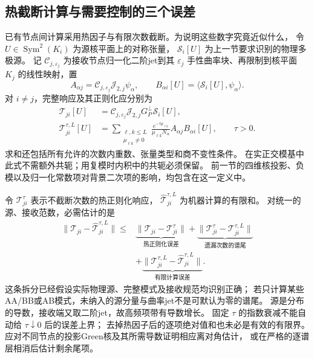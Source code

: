 \documentclass[UTF8,a4paper,11pt,fontset=fandol]{ctexart}
\numberwithin{equation}{section}
\theoremstyle{definition}
\begin{document}
\subsection{热截断计算与需要控制的三个误差}\label{sec:spectralerrors}
已有节点间计算采用热因子与有限次数截断。为说明这些数字究竟近似什么，
令 $U\in\operatorname{Sym}^2(K_i)$ 为源核平面上的对称张量，
$\mathcal S_i[U]$ 为上一节要求识别的物理多极源。
记 $\mathscr C_{j,\varepsilon_j}$ 为接收节点归一化二阶jet到其
$\varepsilon_j$ 手性曲率块、再限制到核平面 $K_j$ 的线性映射，置
\[
A_{\alpha j}=\mathscr C_{j,\varepsilon_j}\mathcal J_{2,j}\psi_\alpha,
\qquad B_{\alpha i}[U]=\langle\mathcal S_i[U],\psi_\alpha\rangle.
\]
对 $i\ne j$，完整响应及其正则化应分别为
\begin{align}
\mathcal T_{ji}[U]&=
\mathscr C_{j,\varepsilon_j}\mathcal J_{2,j}G_P^\perp\mathcal S_i[U],\nonumber\\
\mathcal T_{ji}^{\tau,L}[U]&=
\sum_{\substack{\ell,k\le L\\\mu_{\ell k}\ne0}}
\frac{e^{-\tau\mu_{\ell k}}}{\mu_{\ell k}N_\alpha}
A_{\alpha j}B_{\alpha i}[U],\qquad\tau>0.\label{eq:heat-response}
\end{align}
求和还包括所有允许的次数内重数、张量类型和商不变性条件。
在实正交模基中此式不需额外共轭；用复模时内积中的共轭必须保留。
前一节的四维核投影、负模以及归一化常数项对背景二次项的影响，均包含在这一定义中。

令 $\mathcal T_{ji}^{\tau}$ 表示不截断次数的热正则化响应，
$\widehat{\mathcal T}_{ji}^{\tau,L}$ 为机器计算的有限和。
对统一的源、接收范数，必需估计的是
\begin{equation}\label{eq:spectral-error-budget}
\begin{split}
\|\mathcal T_{ji}-\widehat{\mathcal T}_{ji}^{\tau,L}\|
\le{}&\underbrace{\|\mathcal T_{ji}-\mathcal T_{ji}^{\tau}\|}_{\text{热正则化误差}}
+\underbrace{\|\mathcal T_{ji}^{\tau}-\mathcal T_{ji}^{\tau,L}\|}_{\text{遗漏次数的谱尾}}\\
&+\underbrace{\|\mathcal T_{ji}^{\tau,L}-
\widehat{\mathcal T}_{ji}^{\tau,L}\|}_{\text{有限计算误差}}.
\end{split}
\end{equation}
这条拆分已经假设实际物理源、完整模式及接收规范均识别正确；
若只计算某些AA/BB或AB模式，未纳入的源分量与曲率jet不是可默认为零的谱尾。
源是分布的导数，接收端又取二阶jet，故高频项带有导数增长。
固定 $\tau$ 的指数衰减不能自动给 $\tau\downarrow0$ 后的误差上界；
去掉热因子后的逐项绝对值和也未必是有效的有限界。
应对不同节点的投影Green核及其所需导数证明相应离对角估计，
或在严格的逐谱层相消后估计剩余尾项。
\end{document}
